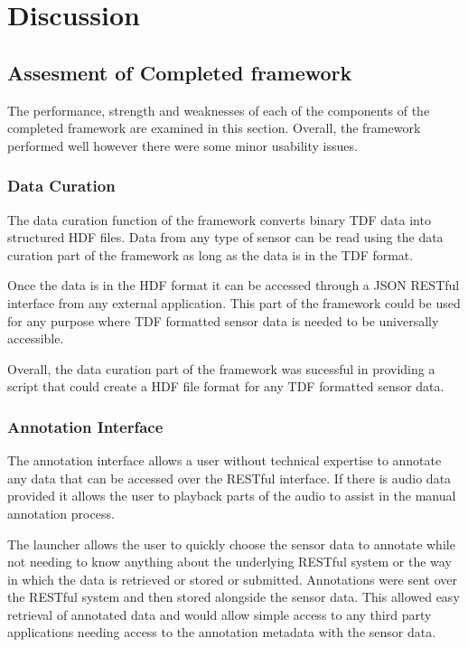 \chapter{Discussion}

\section{Assesment of Completed framework}

The performance, strength and weaknesses of each of the components of the completed framework are examined in this section. Overall, the framework performed well however there were some minor usability issues.

\subsection{Data Curation}

The data curation function of the framework converts binary TDF data into structured HDF files. Data from any type of sensor can be read using the data curation part of the framework as long as the data is in the TDF format. 

Once the data is in the HDF format it can be accessed through a JSON RESTful interface from any external application. This part of the framework could be used for any purpose where TDF formatted sensor data is needed to be universally accessible. 

Overall, the data curation part of the framework was sucessful in providing a script that could create a HDF file format for any TDF formatted sensor data. 

\subsection{Annotation Interface}

The annotation interface allows a user without technical expertise to annotate any data that can be accessed over the RESTful interface. If there is audio data provided it allows the user to playback parts of the audio to assist in the manual annotation process.

The launcher allows the user to quickly choose the sensor data to annotate while not needing to know anything about the underlying RESTful system or the way in which the data is retrieved or stored or submitted. Annotations were sent over the RESTful system and then stored alongside the sensor data. This allowed easy retrieval of annotated data and would allow simple access to any third party applications needing access to the annotation metadata with the sensor data. 


